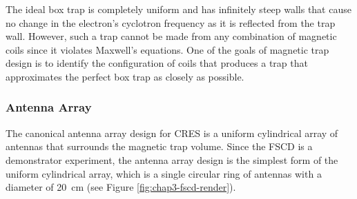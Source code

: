 The ideal box trap is completely uniform and has infinitely steep walls that cause no change in the electron's cyclotron frequency as it is reflected from the trap wall. However, such a trap cannot be made from any combination of magnetic coils since it violates Maxwell's equations. One of the goals of magnetic trap design is to identify the configuration of coils that produces a trap that approximates the perfect box trap as closely as possible.

\subsubsection*{Antenna Array}

The canonical antenna array design for CRES is a uniform cylindrical array of antennas that surrounds the magnetic trap volume. Since the FSCD is a demonstrator experiment, the antenna array design is the simplest form of the uniform cylindrical array, which is a single circular ring of antennas with a diameter of 20~cm (see Figure \ref{fig:chap3-fscd-render}).
